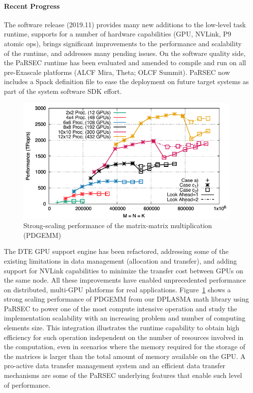 \paragraph{Recent Progress}

The software release (2019.11) provides many new additions to the low-level task
runtime, supports for a number of hardware capabilities (GPU, NVLink, P9 atomic
ops), brings significant improvements to the performance and scalability of the
runtime, and addresses many pending issues.
%
%
On the software quality side, the PaRSEC runtime has been evaluated and amended
to compile and run on all pre-Exascale platforms (ALCF Mira, Theta; OLCF
Summit). PaRSEC now includes a Spack definition file to ease the deployment on
future target systems as part of the system software SDK effort.

\begin{figure}
\centering\includegraphics[scale=0.55]{projects/2.3.1-PMR/2.3.1.09-ParSEC/gemm_summit_mean.pdf}
\caption{Strong-scaling performance of the matrix-matrix multiplication
(PDGEMM)\label{fig:PDGEMM}} \end{figure} The DTE GPU support engine has been
refactored, addressing some of the existing limitations in data management
(allocation and transfer), and adding support for NVLink capabilities to
minimize the transfer cost between GPUs on the same node. All these improvements
have enabled unprecedented performance on distributed, multi-GPU platforms for
real applications.
%
Figure~\ref{fig:PDGEMM} shows a strong scaling performance of PDGEMM from our
DPLASMA math library using PaRSEC to power one of the most compute intensive
operation and study the implementation scalability with an increasing problem
and number of computing elements size. This integration illustrates the runtime
capability to obtain high efficiency for such operation independent on the
number of resources involved in the computation, even in scenarios where the
memory required for the storage of the matrices is larger than the total amount
of memory available on the GPU. A pro-active data transfer management system and
an efficient data transfer mechanisms are some of the PaRSEC underlying features
that enable such level of performance.

